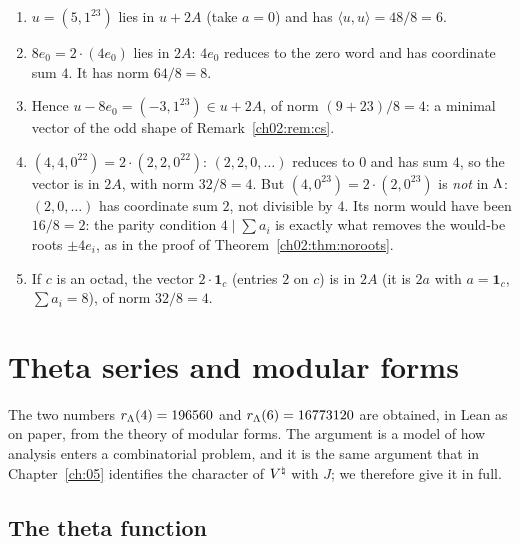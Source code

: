 \begin{example}\label{ch02:ex:leechvectors}
\begin{enumerate}
\item $u=(5,1^{23})$ lies in $u+2A$ (take $a=0$) and has $\langle u,u\rangle=48/8=6$.
\item $8e_0=2\cdot(4e_0)$ lies in $2A$: $4e_0$ reduces to the zero word and has coordinate sum
      $4$.  It has norm $64/8=8$.
\item Hence $u-8e_0=(-3,1^{23})\in u+2A$, of norm $(9+23)/8=4$: a minimal vector of the odd
      shape of Remark~\ref{ch02:rem:cs}.
\item $(4,4,0^{22})=2\cdot(2,2,0^{22})$: $(2,2,0,\dots)$ reduces to $0$ and has sum $4$, so the
      vector is in $2A$, with norm $32/8=4$.  But $(4,0^{23})=2\cdot(2,0^{23})$ is \emph{not} in
      ${\Lambda}$: $(2,0,\dots)$ has coordinate sum $2$, not divisible by $4$.  Its norm would have been
      $16/8=2$: the parity condition $4\mid\sum a_i$ is exactly what removes the would-be roots
      $\pm4e_i$, as in the proof of Theorem~\ref{ch02:thm:noroots}.
\item If $c$ is an octad, the vector $2\cdot\mathbf 1_c$ (entries $2$ on $c$) is in $2A$ (it is
      $2a$ with $a=\mathbf 1_c$, $\sum a_i=8$), of norm $32/8=4$.
\end{enumerate}
\end{example}

\section{Theta series and modular forms}\label{ch02:sec:theta}

The two numbers $r_{\Lambda}(4)=196560$ and $r_{\Lambda}(6)=16773120$ are obtained, in Lean as on paper,
from the theory of modular forms.  The argument is a model of how analysis enters a combinatorial
problem, and it is the same argument that in Chapter~\ref{ch:05} identifies the character of
${V^{\natural}}$ with $J$; we therefore give it in full.

\subsection{The theta function}


